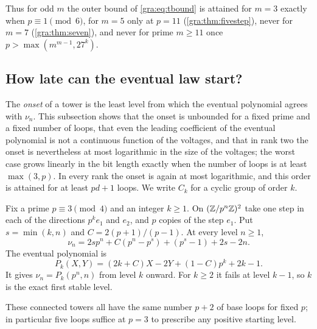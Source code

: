 Thus for odd $m$ the outer bound of \eqref{gra:eq:tbound} is attained for
$m=3$ exactly when $p\equiv1\pmod6$, for $m=5$ only at $p=11$
(\cref{gra:thm:fivestep}), never for $m=7$ (\cref{gra:thm:seven}), and never
for prime $m\ge11$ once $p>\max(m^{m-1},27^k)$.

\subsection{How late can the eventual law start?}\label{gra:sec:onset}

The \emph{onset} of a tower is the least level from which the eventual
polynomial agrees with $\nu_n$. This subsection shows that the onset is
unbounded for a fixed prime and a fixed number of loops, that even the
leading coefficient of the eventual polynomial is not a continuous function
of the voltages, and that in rank two the onset is nevertheless at most
logarithmic in the size of the voltages; the worst case grows linearly in
the bit length exactly when the number of loops is at least $\max(3,p)$.
In every rank the onset is again at most logarithmic, and this order is
attained for at least $pd+1$ loops.
We write $C_k$ for a cyclic group of order $k$.

\begin{theorem}\label{gra:thm:delayed}
Fix a prime $p\equiv3\pmod4$ and an integer $k\ge1$. On
$(\mathbb{Z}/p^n\mathbb{Z})^2$ take one step in each of the directions $p^ke_1$ and $e_2$,
and $p$ copies of the step $e_1$. Put $s=\min(k,n)$ and $C=2(p+1)/(p-1)$.
At every level $n\ge1$,
\[
 \nu_n=2sp^n+C(p^n-p^s)+(p^s-1)+2s-2n .
\]
The eventual polynomial is
\[
 P_k(X,Y)=(2k+C)X-2Y+(1-C)p^k+2k-1 .
\]
It gives $\nu_n=P_k(p^n,n)$ from level $k$ onward. For $k\ge2$ it fails at
level $k-1$, so $k$ is the exact first stable level.
\end{theorem}

These connected towers all have the same number $p+2$ of base loops for
fixed $p$; in particular five loops suffice at $p=3$ to prescribe any
positive starting level.

